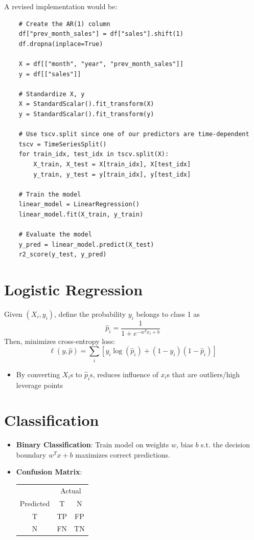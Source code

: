\documentclass{article}
\begin{document}
A revised implementation would be:

\begin{verbatim}
    # Create the AR(1) column
    df["prev_month_sales"] = df["sales"].shift(1)
    df.dropna(inplace=True)

    X = df[["month", "year", "prev_month_sales"]]
    y = df[["sales"]]

    # Standardize X, y
    X = StandardScalar().fit_transform(X)
    y = StandardScalar().fit_transform(y)

    # Use tscv.split since one of our predictors are time-dependent
    tscv = TimeSeriesSplit()
    for train_idx, test_idx in tscv.split(X):
        X_train, X_test = X[train_idx], X[test_idx]
        y_train, y_test = y[train_idx], y[test_idx]
    
    # Train the model
    linear_model = LinearRegression()
    linear_model.fit(X_train, y_train)

    # Evaluate the model
    y_pred = linear_model.predict(X_test)
    r2_score(y_test, y_pred)
\end{verbatim}

\section{Logistic Regression}
Given $(X_i, y_i)$, define the probability $y_i$ belongs to class 1 as
\[
    \hat{p}_i = \frac{1}{1 + e^{-w^Tx_i + b}}
\]
Then, minimizes cross-entropy loss:
\[
    \ell(y, \hat{p}) = \sum_i \left[ y_i \log(\hat{p}_i) + (1 - y_i)(1 - \hat{p}_i) \right]
\]
\begin{itemize}
    \item By converting $X_i$s to $\hat{p}_i$s, reduces influence of $x_i$s that are outliers/high leverage points
\end{itemize}

\section{Classification}
\begin{itemize}
    \item \textbf{Binary Classification}: Train model on weights $w$, bias $b$ s.t. the decision boundary $w^Tx + b$ maximizes correct predictions.
    \item \textbf{Confusion Matrix}:
        \begin{center}
        \begin{tabular}{c|c|c}
             & \multicolumn{2}{c}{Actual} \\
            Predicted & T & N \\
            \hline
            T & TP & FP \\
            N & FN & TN \\
        \end{tabular}
        \end{center}
\end{itemize}
\end{document}
